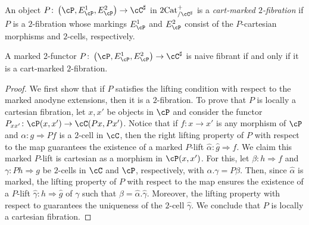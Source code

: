 \documentclass[11pt, dvipsnames]{amsart}
\begin{document}
		\begin{defn}\label{Def:Cart-marked-2-fibrations}
			An object $P\colon\markedscat{\cP} \to \cC^\sharp$ in $\twocat^{+}_{/\cC^\sharp}$ is a \emph{cart-marked $2$-fibration} if $P$ is a $2$-fibration whose markings $E^1_{\cP}$ and $E^2_{\cP}$ consist of the $P$-cartesian morphisms and $2$-cells, respectively.  
		\end{defn}


		\begin{thm}\label{Prop:naivefibrant_iff_cms}
			A marked 2-functor $P\colon \markedscat{\cP} \to \cC^{\sharp}$ is naive fibrant if and only if it is a cart-marked $2$-fibration.
		\end{thm}

		\begin{proof}
			We first show that if $P$ satisfies the lifting condition with respect to the marked anodyne extensions, then it is a $2$-fibration. To prove that $P$ is locally a cartesian fibration, let $x,x'$ be objects in $\cP$ and consider the functor $P_{xx'}\colon \cP(x,x') \to \cC(Px,Px')$. Notice that if $f\colon x\to x'$ is any morphism of $\cP$ and $\alpha\colon g \Rightarrow Pf$ is a $2$-cell in $\cC$, then the right lifting property of $P$ with respect to the map  guarantees the existence of a marked $P$-lift $\widehat{\alpha}\colon \widehat{g} \Rightarrow f$. We claim this marked $P$-lift is cartesian as a morphism in $\cP(x,x')$. For this, let $\beta\colon h \Rightarrow f$ and $\gamma\colon Ph \Rightarrow g$ be $2$-cells in $\cC$ and $\cP$, respectively, with $\alpha.\gamma = P\beta$. Then, since $\widehat{\alpha}$ is marked, the lifting property of $P$ with respect to the map  ensures the existence of a $P$-lift $\widehat{\gamma}\colon h\Rightarrow\widehat{g}$ of $\gamma$ such that $\beta = \widehat{\alpha}.\widehat{\gamma}$. Moreover, the lifting property with respect to  guarantees the uniqueness of the $2$-cell $\widehat{\gamma}$. We conclude that $P$ is locally a cartesian fibration. 
					

\end{proof}
\end{document}
